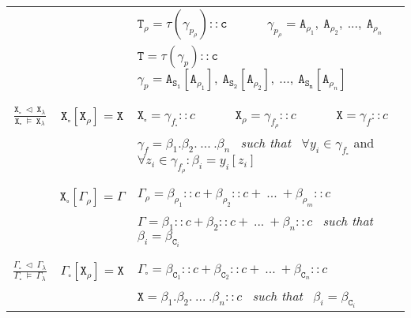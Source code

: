 \documentclass{entcs}
\renewcommand{\~}[0]{\texttildelow}
\begin{document}
\begin{defn}
\begin{center}
{\begin{tabular}{ c | | c | l }
     &  & $ \mathtt{T}_\rho = \tau(\gamma_{p_\rho})::\mathtt{c}$ ~~~~~ $ \gamma_{p_\rho} = \mathtt{A}_{\rho_1}, ~\mathtt{A}_{\rho_2}, ~..., ~\mathtt{A}_{\rho_n} $ \\
     &  & $\mathtt{T} = \tau(\gamma_{p})::\mathtt{c} $ ~~~~~ $\gamma_{p} = \mathtt{A}_\mathtt{S_1}[\mathtt{A}_{\rho_1}],~\mathtt{A}_\mathtt{S_2}[\mathtt{A}_{\rho_2}],~... ,~\mathtt{A}_\mathtt{S_n}[\mathtt{A}_{\rho_n}]$ \\

    & & \\[0.02cm]
    \hline
    & & \\[0.02cm]

    $\frac{\mathtt{X}_{\square}~\lhd~\mathtt{X}_{\lambda}}{\mathtt{X}_{\square}~\models~\mathtt{X}_{\lambda}}$ & 
    $ \mathtt{X}_{\square}[\mathtt{X}_\rho] = \mathtt{X} $ & 
    $ \mathtt{X}_{\square} = \gamma_{f_{\square}}::c$ ~~~~~ $ \mathtt{X}_\rho = \gamma_{f_\rho}::c $ ~~~~~ $ \mathtt{X} = \gamma_{f}::c $\\

     &  & $\gamma_{f} = \beta_1.\beta_2.~...~.\beta_n $~ \emph{such that} ~$ \forall y_i \in \gamma_{f_{\square}}$ and $ \forall z_i \in \gamma_{f_\rho} : \beta_i = y_i[z_i]$ \\

	& & \\[0.02cm]
    \hline
    & & \\[0.02cm]

     & 
    $ \mathtt{X}_{\square}[\Gamma_\rho] = \Gamma $ & 
    $ \Gamma_\rho = \beta_{\rho_1}::c + \beta_{\rho_2}::c + ~...~+ \beta_{\rho_m}::c $\\

     &  & $ \Gamma = \beta_1::c + \beta_2::c + ~...~+ \beta_n::c $~ \emph{such that} ~$ \beta_i = \beta_{\mathtt{C}_i}$ \\

    & & \\[0.02cm]
    \hline
    & & \\[0.02cm]

	$ \frac{\Gamma_{\square}~\lhd~\Gamma_\lambda}{\Gamma_{\square}~\models~\Gamma_\lambda} $ & 
    $ \Gamma_{\square}[\mathtt{X}_\rho] = \mathtt{X} $ & 
    $ \Gamma_{\square} = \beta_{\mathtt{C}_1}::c + \beta_{\mathtt{C}_2}::c + ~...~+ \beta_{\mathtt{C}_n}::c $\\

     &  & $ \mathtt{X} = \beta_1.\beta_2.~...~.\beta_n::c $~ \emph{such that} ~$ \beta_i = \beta_{\mathtt{C}_i} $ \\


\end{tabular}}
\end{center}
\end{defn}
\end{document}
